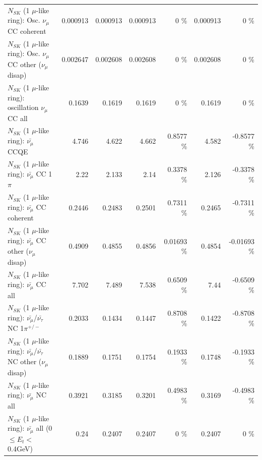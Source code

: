 \begin{table}
\begin{tabular}{| l | r | r | r  r | r  r |}
                        $N_{SK}$ (1 $\mu$-like ring): Osc. $\nu_\mu$ CC coherent &        0.000913 &        0.000913 &        0.000913 &        0 \%  &        0.000913 &        0 \%  \\ 
         $N_{SK}$ (1 $\mu$-like ring): Osc. $\nu_\mu$ CC other ($\nu_\mu$ disap) &        0.002647 &        0.002608 &        0.002608 &        0 \%  &        0.002608 &        0 \%  \\ 
                      $N_{SK}$ (1 $\mu$-like ring): oscillation $\nu_\mu$ CC all &          0.1639 &          0.1619 &          0.1619 &        0 \%  &          0.1619 &        0 \%  \\ 
\hline
\hline
                              $N_{SK}$ (1 $\mu$-like ring): $\bar{\nu_\mu}$ CCQE &           4.746 &           4.622 &           4.662 &   0.8577 \%  &           4.582 &  -0.8577 \%  \\ 
                         $N_{SK}$ (1 $\mu$-like ring): $\bar{\nu_\mu}$ CC 1$\pi$ &            2.22 &           2.133 &            2.14 &   0.3378 \%  &           2.126 &  -0.3378 \%  \\ 
                       $N_{SK}$ (1 $\mu$-like ring): $\bar{\nu_\mu}$ CC coherent &          0.2446 &          0.2483 &          0.2501 &   0.7311 \%  &          0.2465 &  -0.7311 \%  \\ 
        $N_{SK}$ (1 $\mu$-like ring): $\bar{\nu_\mu}$ CC other ($\nu_\mu$ disap) &          0.4909 &          0.4855 &          0.4856 &  0.01693 \%  &          0.4854 & -0.01693 \%  \\ 
                          $N_{SK}$ (1 $\mu$-like ring): $\bar{\nu_{\mu}}$ CC all &           7.702 &           7.489 &           7.538 &   0.6509 \%  &            7.44 &  -0.6509 \%  \\ 
\hline
  $N_{SK}$ (1 $\mu$-like ring): $\bar{\nu_\mu}$/$\bar{\nu_\tau}$ NC 1$\pi^{+/-}$ &          0.2033 &          0.1434 &          0.1447 &   0.8708 \%  &          0.1422 &  -0.8708 \%  \\ 
$N_{SK}$ (1 $\mu$-like ring): $\bar{\nu_\mu}$/$\bar{\nu_\tau}$ NC other ($\nu_\mu$ disap) &          0.1889 &          0.1751 &          0.1754 &   0.1933 \%  &          0.1748 &  -0.1933 \%  \\ 
                          $N_{SK}$ (1 $\mu$-like ring): $\bar{\nu_{\mu}}$ NC all &          0.3921 &          0.3185 &          0.3201 &   0.4983 \%  &          0.3169 &  -0.4983 \%  \\ 
\hline
   $N_{SK}$ (1 $\mu$-like ring): $\bar{\nu_{\mu}}$ all (0 $\leq E_{t} <$ 0.4GeV) &            0.24 &          0.2407 &          0.2407 &        0 \%  &          0.2407 &        0 \%  \\ 

\end{tabular}
\end{table}
